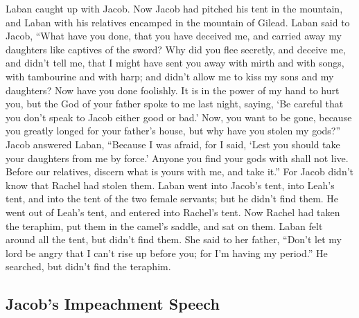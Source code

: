 \begin{paracol}{2}
\begin{otherlanguage}{english}
 Laban caught up with Jacob. Now Jacob had pitched his
tent in the mountain, and Laban with his relatives encamped in the
mountain of Gilead.  Laban said to Jacob, ``What have you
done, that you have deceived me, and carried away my daughters like
captives of the sword?  Why did you flee secretly, and
deceive me, and didn't tell me, that I might have sent you away with
mirth and with songs, with tambourine and with harp;  and
didn't allow me to kiss my sons and my daughters? Now have you done
foolishly.  It is in the power of my hand to hurt you,
but the God of your father spoke to me last night, saying, `Be careful
that you don't speak to Jacob either good or bad.'  Now,
you want to be gone, because you greatly longed for your father's house,
but why have you stolen my gods?''  Jacob answered Laban,
``Because I was afraid, for I said, `Lest you should take your daughters
from me by force.'  Anyone you find your gods with shall
not live. Before our relatives, discern what is yours with me, and take
it.'' For Jacob didn't know that Rachel had stolen them. 
Laban went into Jacob's tent, into Leah's tent, and into the tent of the
two female servants; but he didn't find them. He went out of Leah's
tent, and entered into Rachel's tent.  Now Rachel had
taken the teraphim, put them in the camel's saddle, and sat on them.
Laban felt around all the tent, but didn't find them. 
She said to her father, ``Don't let my lord be angry that I can't rise
up before you; for I'm having my period.'' He searched, but didn't find
the teraphim.

\hypertarget{jacobs-impeachment-speech}{%
\subsection{Jacob's Impeachment
Speech}\label{jacobs-impeachment-speech}}


\end{otherlanguage}
\end{paracol}

